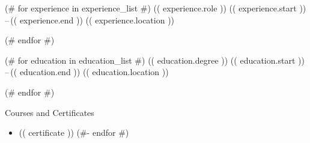 \documentclass[10pt,a4paper,ragged2e,withhyper]{altacv}
\begin{document}
  \begin{paracol}{2}


    (# for experience in experience_list #)
        \cvevent
            { (( experience.role )) }
            {  }
            {(( experience.start )) --\,(( experience.end ))}
            {(( experience.location ))}%
        \hfill\par%
        \bigskip%
    (# endfor #)

    \vspace{-0.3em} %
    (# for education in education_list #)
        \cvevent
            { (( education.degree )) }
            {  }
            {(( education.start )) --\,(( education.end ))}
            {(( education.location ))}%
        \hfill\par%
        \bigskip%
    (# endfor #)

    \smallskip\divider%
    \vspace{-0.6em} %

    \cvevent
        {Courses and Certificates}
        {}
        {}
        {}%
    \begin{itemize}
        \setlength\itemsep{0em}
        (#- for certificate in certificates_list #)
            \item (( certificate ))
        (#- endfor #)
    \end{itemize}




\end{paracol}
\end{document}
